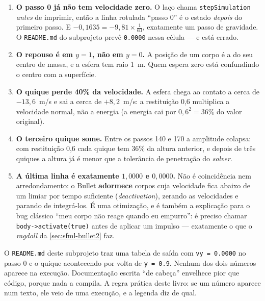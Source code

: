 \begin{enumerate}
  \item \textbf{O passo 0 já não tem velocidade zero.} O laço chama
        \texttt{stepSimulation} \emph{antes} de imprimir, então a linha rotulada
        ``passo 0'' é o estado \emph{depois} do primeiro passo. E
        $-0{,}1635 = -9{,}81 \times \tfrac{1}{60}$, exatamente um passo de
        gravidade. O \texttt{README.md} do subprojeto prevê
        \texttt{0.0000} nessa célula --- e está errado.
  \item \textbf{O repouso é em $y = 1$, não em $y = 0$.} A posição de um corpo é
        a do seu centro de massa, e a esfera tem raio 1~m. Quem espera zero está
        confundindo o centro com a superfície.
  \item \textbf{O quique perde 40\% da velocidade.} A esfera chega ao contato a
        cerca de $-13{,}6$~m/s e sai a cerca de $+8{,}2$~m/s: a restituição 0,6
        multiplica a velocidade normal, não a energia (a energia cai por
        $0{,}6^2 = 36\%$ do valor original).
  \item \textbf{O terceiro quique some.} Entre os passos 140 e 170 a amplitude
        colapsa: com restituição 0,6 cada quique tem $36\%$ da altura anterior, e
        depois de três quiques a altura já é menor que a tolerância de
        penetração do \emph{solver}.
  \item \textbf{A última linha é exatamente $1{,}0000$ e $0{,}0000$.} Não é
        coincidência nem arredondamento: o Bullet \textbf{adormece} corpos cuja
        velocidade fica abaixo de um limiar por tempo suficiente
        (\emph{deactivation}), zerando as velocidades e parando de integrá-los.
        É uma otimização, e é também a explicação para o bug clássico ``meu
        corpo não reage quando eu empurro'': é preciso chamar
        \texttt{body->activate(true)} antes de aplicar um impulso --- exatamente
        o que o \emph{ragdoll} da \cref{sec:sfml-bullet2} faz.
\end{enumerate}

\begin{armadilha}
O \texttt{README.md} deste subprojeto traz uma tabela de saída com
\texttt{vy = 0.0000} no passo 0 e o quique acontecendo por volta de
\texttt{y = 0.9}. Nenhum dos dois números aparece na execução. Documentação
escrita ``de cabeça'' envelhece pior que código, porque nada a compila. A regra
prática deste livro: se um número aparece num texto, ele veio de uma execução, e
a legenda diz de qual.
\end{armadilha}

